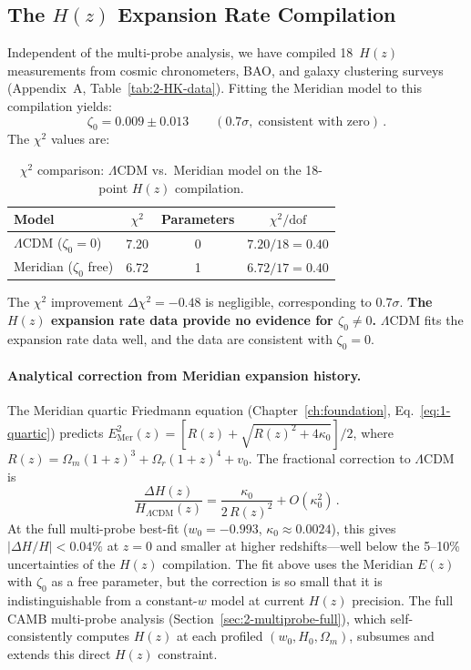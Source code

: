 \subsection{The $H(z)$ Expansion Rate Compilation}
\label{sec:2-Hz}

Independent of the multi-probe analysis, we have compiled 18~$H(z)$ measurements from cosmic chronometers, BAO, and galaxy clustering surveys (Appendix~A, Table~\ref{tab:2-HK-data}). Fitting the Meridian model to this compilation yields:
\begin{equation}
\zeta_0 = 0.009 \pm 0.013 \qquad (0.7\sigma,\;\text{consistent with zero})\,.
\label{eq:2-zeta0-Hz}
\end{equation}
The $\chi^2$ values are:

\begin{table}[htbp]
\centering
\caption{$\chi^2$ comparison: $\Lambda$CDM vs.\ Meridian model on the 18-point $H(z)$ compilation.}
\label{tab:2-chi2-Hz}
\begin{tabular}{lccc}
\toprule
Model & $\chi^2$ & Parameters & $\chi^2/\mathrm{dof}$ \\
\midrule
$\Lambda$CDM ($\zeta_0 = 0$) & 7.20 & 0 & $7.20/18 = 0.40$ \\
Meridian ($\zeta_0$ free) & 6.72 & 1 & $6.72/17 = 0.40$ \\
\bottomrule
\end{tabular}
\end{table}

The $\chi^2$ improvement $\Delta\chi^2 = -0.48$ is negligible, corresponding to $0.7\sigma$. \textbf{The $H(z)$ expansion rate data provide no evidence for $\zeta_0 \neq 0$.} $\Lambda$CDM fits the expansion rate data well, and the data are consistent with $\zeta_0 = 0$.

\paragraph{Analytical correction from Meridian expansion history.} The Meridian quartic Friedmann equation (Chapter~\ref{ch:foundation}, Eq.~\eqref{eq:1-quartic}) predicts $E^2_\mathrm{Mer}(z) = [R(z) + \sqrt{R(z)^2 + 4\kappa_0}]/2$, where $R(z) = \Omega_m(1+z)^3 + \Omega_r(1+z)^4 + v_0$. The fractional correction to $\Lambda$CDM is
\begin{equation}
\frac{\Delta H(z)}{H_{\Lambda\mathrm{CDM}}(z)} = \frac{\kappa_0}{2\,R(z)^2} + O(\kappa_0^2)\,.
\label{eq:2-Hz-correction}
\end{equation}
At the full multi-probe best-fit ($w_0 = -0.993$, $\kappa_0 \approx 0.0024$), this gives $|\Delta H/H| < 0.04\%$ at $z = 0$ and smaller at higher redshifts---well below the 5--10\% uncertainties of the $H(z)$ compilation. The fit above uses the Meridian $E(z)$ with $\zeta_0$ as a free parameter, but the correction is so small that it is indistinguishable from a constant-$w$ model at current $H(z)$ precision. The full CAMB multi-probe analysis (Section~\ref{sec:2-multiprobe-full}), which self-consistently computes $H(z)$ at each profiled $(w_0, H_0, \Omega_m)$, subsumes and extends this direct $H(z)$ constraint.

